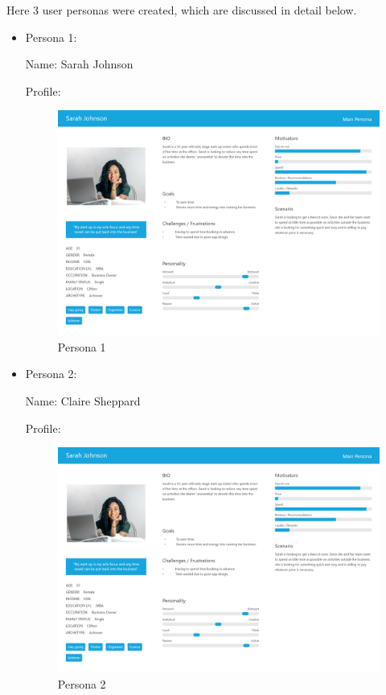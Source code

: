 \documentclass[12pt]{article}
\begin{document}
	Here 3 user personas were created, which are discussed in detail below.
	\begin{itemize}
		\item Persona 1: 
		
		Name: Sarah Johnson
		
		Profile: 
		\begin{figure}[H]

			\includegraphics[scale=0.2]{images/persona_1.png}
			\caption{Persona 1}
			\label{fig:persona_1}
		\end{figure}
		
		\item Persona 2:
		
		Name:  Claire Sheppard
		
		
		Profile: 
		\begin{figure}[H]
			
			\includegraphics[scale=0.2]{images/persona_1.png}
			\caption{Persona 2}
			\label{fig:persona_2}
		\end{figure}
		

\end{itemize}
\end{document}
